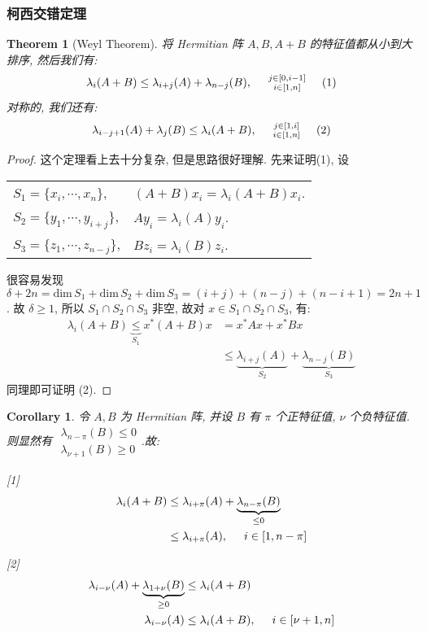 \documentclass{article}
\newtheorem*{theorem}{Theorem}
\newtheorem{corollary}{Corollary}
\def\dim{\mathrm{dim}\,}
\begin{document}
\subsubsection{柯西交错定理}
\begin{theorem}[Weyl Theorem]
  将 Hermitian 阵 $A, B, A+B$ 的特征值都从小到大排序, 然后我们有:
  \[\lambda_i(A + B) \leq \lambda_{i+j}(A) + \lambda_{n-j}(B), \hspace{0.5cm} \substack{j\in[0, i-1]\\i\in[1,n]}\hspace{0.5cm} (1)\]
  对称的, 我们还有:
  \[\lambda_{i-j+1}(A) + \lambda_j(B) \leq \lambda_i (A + B), \hspace{0.5cm} \substack{j\in[1, i]\\ i\in[1,n]} \hspace{0.5cm} (2)\]
\end{theorem}
\begin{proof}
  这个定理看上去十分复杂, 但是思路很好理解.
  先来证明(1), 设
  
  \begin{tabular}{ll}
    $S_1 = \{x_i, \cdots, x_n\}$, & $(A+B)x_i = \lambda_i(A+B)x_i$. \\
    $S_2 = \{y_1, \cdots, y_{i+j}\}$, & $Ay_i = \lambda_i(A)y_i$. \\
    $S_3 = \{z_1, \cdots, z_{n-j}\}$, & $Bz_i = \lambda_i(B)z_i$.
  \end{tabular}

  很容易发现 $\delta + 2n = \dim S_1 + \dim S_2 + \dim S_3 = (i+j) + (n-j) + (n-i+1) = 2n+1$.
  故 $\delta \geq 1$, 所以 $S_1 \cap S_2 \cap S_3$ 非空, 故对 $x\in S_1\cap S_2\cap S_3$, 有:
  \begin{align*}
    \lambda_i(A+B) \underbrace{\leq}_{S_1} x^*(A+B)x &= x^*Ax + x^*Bx \\
    &\leq \underbrace{\lambda_{i+j}(A)}_{S_2} + \underbrace{\lambda_{n-j}(B)}_{S_3}
  \end{align*}
  同理即可证明 (2).
\end{proof}

\begin{corollary}
  令 $A, B$ 为 Hermitian 阵, 并设 $B$ 有 $\pi$ 个正特征值, $\nu$ 个负特征值.
  则显然有 $\substack{\lambda_{n-\pi}(B) \leq 0 \\ \lambda_{\nu+1}(B) \geq 0}$.故:

  [1]
  \begin{align*}
    \lambda_i(A + B) &\leq \lambda_{i+\pi}(A) + \underbrace{\lambda_{n-\pi}(B)}_{\leq 0} \\
    &\leq \lambda_{i+\pi}(A), \hspace{0.5cm} i\in[1, n-\pi]
  \end{align*}

  [2]
  \begin{align*}
    \lambda_{i-\nu}(A) + \underbrace{\lambda_{1+\nu}(B)}_{\geq 0} &\leq \lambda_i(A+B) \\
    \lambda_{i-\nu}(A) &\leq \lambda_i(A+B), \hspace{0.5cm} i\in[\nu+1, n]
  \end{align*}
\end{corollary}
\end{document}
